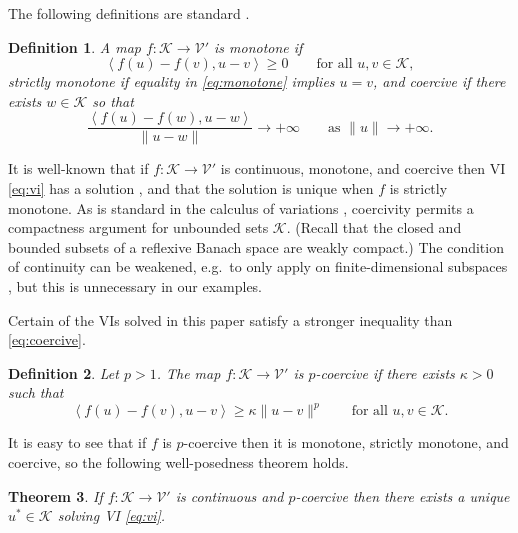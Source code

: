 \documentclass[letterpaper,final,12pt,reqno]{amsart}
\theoremstyle{cstyle}
\newtheorem{theorem}{Theorem}
\theoremstyle{cstyle*}
\theoremstyle{dstyle}
\newtheorem{definition}[theorem]{Definition}
\numberwithin{equation}{section}
\numberwithin{figure}{section}
\numberwithin{table}{section}
\numberwithin{theorem}{section}
\newcommand{\cK}{\mathcal{K}}
\newcommand{\cV}{\mathcal{V}}
\newcommand{\ip}[2]{\left<#1,#2\right>}
\begin{document}
The following definitions are standard \cite{KinderlehrerStampacchia1980}.

\begin{definition}  A map $f:\cK \to \cV'$ is \emph{monotone} if
\begin{equation}
\ip{f(u)-f(v)}{u-v} \ge 0 \qquad \text{for all } u,v \in \cK, \label{eq:monotone}
\end{equation}
\emph{strictly monotone} if equality in \eqref{eq:monotone} implies $u=v$, and \emph{coercive} if there exists $w \in \cK$ so that
\begin{equation}
\frac{\ip{f(u)-f(w)}{u-w}}{\|u-w\|} \to +\infty \qquad \text{as } \|u\|\to +\infty. \label{eq:coercive}
\end{equation}
\end{definition}

It is well-known that if $f:\cK \to \cV'$ is continuous, monotone, and coercive then VI \eqref{eq:vi} has a solution \cite[Corollary III.1.8]{KinderlehrerStampacchia1980}, and that the solution is unique when $f$ is strictly monotone.  As is standard in the calculus of variations \cite{Evans2010}, coercivity permits a compactness argument for unbounded sets $\cK$.  (Recall that the closed and bounded subsets of a reflexive Banach space are weakly compact.)  The condition of continuity can be weakened, e.g.~to only apply on finite-dimensional subspaces \cite{KinderlehrerStampacchia1980}, but this is unnecessary in our examples.

Certain of the VIs solved in this paper satisfy a stronger inequality than \eqref{eq:coercive}.

\begin{definition}  Let $p>1$.  The map $f:\cK \to \cV'$ is \emph{$p$-coercive} if there exists $\kappa>0$ such that
\begin{equation}
\ip{f(u)-f(v)}{u-v} \ge \kappa \|u-v\|^p \qquad \text{for all } u,v \in \cK. \label{eq:pcoercive}
\end{equation}
\end{definition}

It is easy to see that if $f$ is $p$-coercive then it is monotone, strictly monotone, and coercive, so the following well-posedness theorem holds.

\begin{theorem}  \label{thm:viwellposed}  If $f:\cK \to \cV'$ is continuous and $p$-coercive then there exists a unique $u^*\in \cK$ solving VI \eqref{eq:vi}.
\end{theorem}
\end{document}
